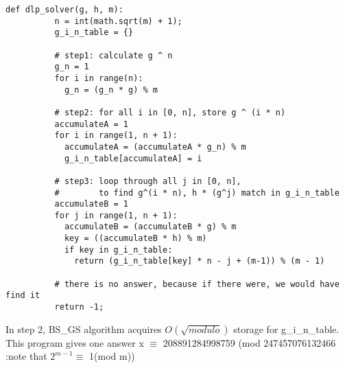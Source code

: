 \documentclass[12pt,letterpaper]{article}
\begin{document}
\begin{enumerate}
\begin{lstlisting}[style = Python]
        def dlp_solver(g, h, m):
          n = int(math.sqrt(m) + 1);  
          g_i_n_table = {}
          
          # step1: calculate g ^ n
          g_n = 1
          for i in range(n):
            g_n = (g_n * g) % m
    
          # step2: for all i in [0, n], store g ^ (i * n)
          accumulateA = 1
          for i in range(1, n + 1):
            accumulateA = (accumulateA * g_n) % m
            g_i_n_table[accumulateA] = i
        
          # step3: loop through all j in [0, n],
          #        to find g^(i * n), h * (g^j) match in g_i_n_table
          accumulateB = 1
          for j in range(1, n + 1):
            accumulateB = (accumulateB * g) % m
            key = ((accumulateB * h) % m)
            if key in g_i_n_table:
              return (g_i_n_table[key] * n - j + (m-1)) % (m - 1)
        
          # there is no answer, because if there were, we would have find it
          return -1;  
      \end{lstlisting}
      In step 2, BS\_GS algorithm acquires $O(\sqrt{modulo})$ storage for g\_i\_n\_table.
      This program gives one answer x $\equiv$ 208891284998759 (mod 247457076132466 :note that $2^{m-1} \equiv$ 1(mod m))


\end{enumerate}
\end{document}
